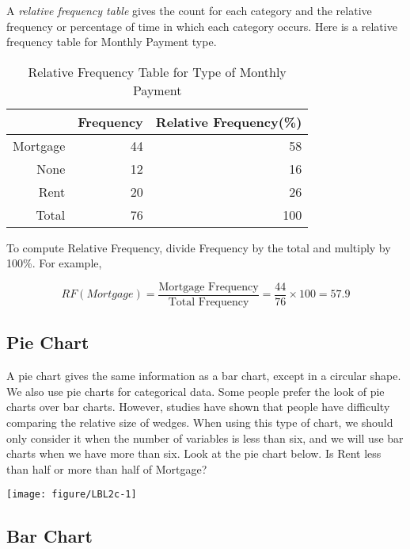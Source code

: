 \documentclass[11pt]{book}\usepackage[]{graphicx}\usepackage[]{color}
\begin{document}
A \textit{relative frequency table} gives the count for each category and the relative frequency or percentage of time in which each category occurs.  Here is a relative frequency table for Monthly Payment type.

\begin{table}[ht]
\centering
\begin{tabular}{rrr}
  \hline
 & Frequency & Relative Frequency(\%) \\ 
  \hline
Mortgage & 44 & 58 \\ 
  None & 12 & 16 \\ 
  Rent & 20 & 26 \\ 
  Total & 76 & 100 \\ 
   \hline
\end{tabular}
\caption{Relative Frequency Table for Type of Monthly Payment} 
\end{table}


To compute Relative Frequency, divide Frequency by the total and multiply by 100\%.  For example,

\begin{equation*}
RF(Mortgage) = \frac{\text{Mortgage Frequency}}{\text{Total Frequency}} = \frac{44}{76} \times 100 = 57.9
\end{equation*}

\subsection{Pie Chart}

A pie chart gives the same information as a bar chart, except in a circular shape.  We also use pie charts for categorical data. Some people prefer the look of pie charts over bar charts.  However, studies have shown that people have difficulty comparing the relative size of wedges.  When using this type of chart, we should only consider it when the number of variables is less than six, and we will use bar charts when we have more than six.  Look at the pie chart below.  Is Rent less than half or more than half of Mortgage?



{\centering \texttt{[image: figure/LBL2c-1]} 

}





\newpage

\subsection{Bar Chart}
\end{document}
